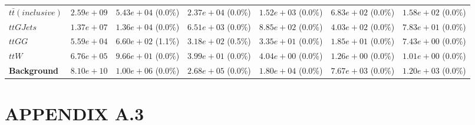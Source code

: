 \begin{landscape}
\begin{table}[h!]
\begin{tabular}{ |l|c|c|c|c|c|c| }
                    $t\bar{t} (inclusive)$ &  $2.59e+09$ &   $5.43e+04$ (0.0\%) &  $2.37e+04$ (0.0\%) &  $1.52e+03$ (0.0\%) &    $6.83e+02$ (0.0\%) &    $1.58e+02$ (0.0\%) \\
                                 $ttGJets$ &  $1.37e+07$ &   $1.36e+04$ (0.0\%) &  $6.51e+03$ (0.0\%) &  $8.85e+02$ (0.0\%) &    $4.03e+02$ (0.0\%) &    $7.83e+01$ (0.0\%) \\
                                    $ttGG$ &  $5.59e+04$ &   $6.60e+02$ (1.1\%) &  $3.18e+02$ (0.5\%) &  $3.35e+01$ (0.0\%) &    $1.85e+01$ (0.0\%) &    $7.43e+00$ (0.0\%) \\
                                     $ttW$ &  $6.76e+05$ &   $9.66e+01$ (0.0\%) &  $3.99e+01$ (0.0\%) &  $4.04e+00$ (0.0\%) &    $1.26e+00$ (0.0\%) &    $1.01e+00$ (0.0\%) \\
                       \textbf{Background} &  $8.10e+10$ &   $1.00e+06$ (0.0\%) &  $2.68e+05$ (0.0\%) &  $1.80e+04$ (0.0\%) &    $7.67e+03$ (0.0\%) &    $1.20e+03$ (0.0\%) \\
    \hline
\end{tabular}
\label{semileptonic_cutflow}
\end{table}
\end{landscape}


\section*{APPENDIX A.3}\label{App3}

